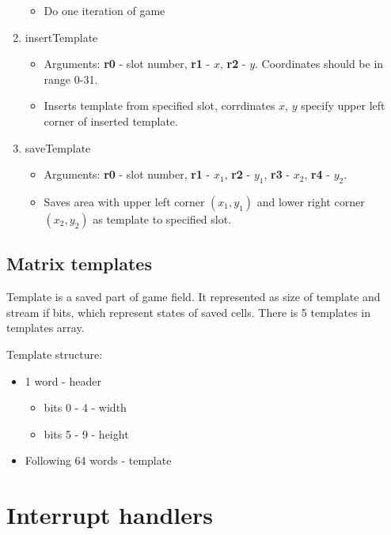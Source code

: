 \begin{enumerate}
\begin{itemize}
			\item Do one iteration of game
		\end{itemize}
	\item insertTemplate
		\begin{itemize}
			\item Arguments: \textbf{r0} - slot number, \textbf{r1} - $x$, \textbf{r2} - $y$. Coordinates should be in range 0-31.
			\item Inserts template from specified slot, corrdinates $x$, $y$ specify upper left corner of inserted template.
		\end{itemize}
	\item saveTemplate
		\begin{itemize}
			\item Arguments: \textbf{r0} - slot number, \textbf{r1} - $x_{1}$, \textbf{r2} - $y_{1}$, \textbf{r3} - $x_{2}$, \textbf{r4} - $y_{2}$.
			\item Saves area with upper left corner $(x_{1}, y_{1})$ and lower right corner $(x_{2}, y_{2})$ as template to specified slot.
		\end{itemize}
\end{enumerate}

\subsection*{Matrix templates}

Template is a saved part of game field. It represented as size of template and stream if bits, which represent states of saved cells. There is 5 templates in templates array.

Template structure:

\begin{itemize}
	\item 1 word - header
		\begin{itemize}
			\item bits 0 - 4 - width
			\item bits 5 - 9 - height
		\end{itemize}
	\item Following 64 words - template
\end{itemize}

\section*{Interrupt handlers}

